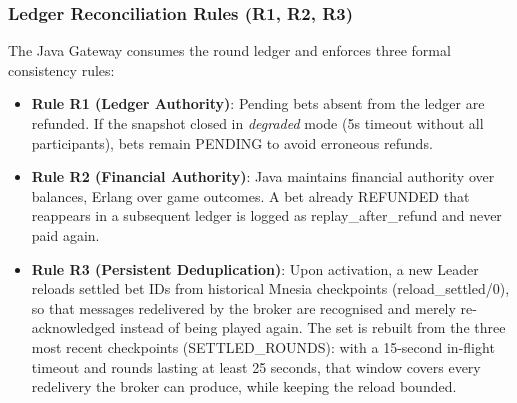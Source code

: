 \documentclass[12pt,a4paper]{article}
\begin{document}
\subsubsection{Ledger Reconciliation Rules (R1, R2, R3)}
The Java Gateway consumes the round ledger and enforces three formal consistency rules:
\begin{itemize}
    \item \textbf{Rule R1 (Ledger Authority)}: Pending bets absent from the ledger are refunded. If the snapshot closed in \textit{degraded} mode (5s timeout without all participants), bets remain PENDING to avoid erroneous refunds.
    \item \textbf{Rule R2 (Financial Authority)}: Java maintains financial authority over balances, Erlang over game outcomes. A bet already REFUNDED that reappears in a subsequent ledger is logged as replay\_\allowbreak after\_\allowbreak refund and never paid again.
    \item \textbf{Rule R3 (Persistent Deduplication)}: Upon activation, a new Leader reloads settled bet IDs from historical Mnesia checkpoints (reload\_\allowbreak settled/0), so that messages redelivered by the broker are recognised and merely re-acknowledged instead of being played again. The set is rebuilt from the three most recent checkpoints (SETTLED\_\allowbreak ROUNDS): with a 15-second in-flight timeout and rounds lasting at least 25 seconds, that window covers every redelivery the broker can produce, while keeping the reload bounded.
\end{itemize}
\end{document}
